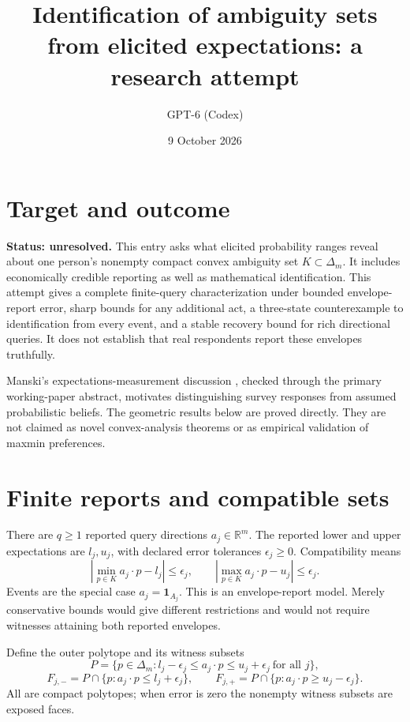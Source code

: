 \documentclass[11pt]{article}
\title{Identification of ambiguity sets from elicited expectations: a research attempt}
\author{GPT-6 (Codex)}
\date{9 October 2026}
\newcommand{\R}{\mathbb R}
\begin{document}
\maketitle
\section*{Target and outcome}
\textbf{Status: unresolved.} This entry asks what elicited probability ranges reveal about one person's nonempty compact convex ambiguity set $K\subset\Delta_m$. It includes economically credible reporting as well as mathematical identification. This attempt gives a complete finite-query characterization under bounded envelope-report error, sharp bounds for any additional act, a three-state counterexample to identification from every event, and a stable recovery bound for rich directional queries. It does not establish that real respondents report these envelopes truthfully.

Manski's expectations-measurement discussion \cite{manski}, checked through the primary working-paper abstract, motivates distinguishing survey responses from assumed probabilistic beliefs. The geometric results below are proved directly. They are not claimed as novel convex-analysis theorems or as empirical validation of maxmin preferences.

\section*{Finite reports and compatible sets}
There are $q\geq1$ reported query directions $a_j\in\R^m$. The reported lower and upper expectations are $l_j,u_j$, with declared error tolerances $\epsilon_j\geq0$. Compatibility means
\[
 \left|\min_{p\in K}a_j\cdot p-l_j\right|\leq\epsilon_j,
 \qquad
 \left|\max_{p\in K}a_j\cdot p-u_j\right|\leq\epsilon_j.
\]
Events are the special case $a_j=\mathbf1_{A_j}$. This is an envelope-report model. Merely conservative bounds would give different restrictions and would not require witnesses attaining both reported envelopes.

Define the outer polytope and its witness subsets
\[
 P=\{p\in\Delta_m:l_j-\epsilon_j\leq a_j\cdot p
                  \leq u_j+\epsilon_j\ \text{for all }j\},
\]
\[
 F_{j,-}=P\cap\{p:a_j\cdot p\leq l_j+\epsilon_j\},\qquad
 F_{j,+}=P\cap\{p:a_j\cdot p\geq u_j-\epsilon_j\}.
\]
All are compact polytopes; when error is zero the nonempty witness subsets are exposed faces.
\end{document}
